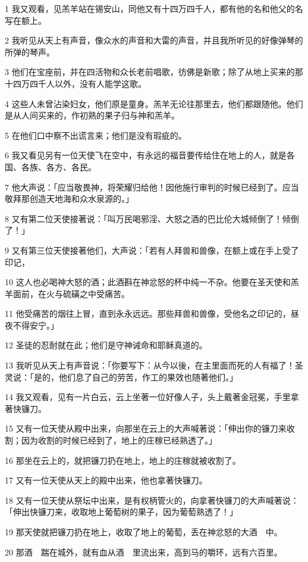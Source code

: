 \par 1 我又观看，见羔羊站在锡安山，同他又有十四万四千人，都有他的名和他父的名写在额上。
\par 2 我听见从天上有声音，像众水的声音和大雷的声音，并且我所听见的好像弹琴的所弹的琴声。
\par 3 他们在宝座前，并在四活物和众长老前唱歌，彷佛是新歌；除了从地上买来的那十四万四千人以外，没有人能学这歌。
\par 4 这些人未曾沾染妇女，他们原是童身。羔羊无论往那里去，他们都跟随他。他们是从人间买来的，作初熟的果子归与神和羔羊。
\par 5 在他们口中察不出谎言来；他们是没有瑕疵的。
\par 6 我又看见另有一位天使飞在空中，有永远的福音要传给住在地上的人，就是各国、各族、各方、各民。
\par 7 他大声说：「应当敬畏神，将荣耀归给他！因他施行审判的时候已经到了。应当敬拜那创造天地海和众水泉源的。」
\par 8 又有第二位天使接著说：「叫万民喝邪淫、大怒之酒的巴比伦大城倾倒了！倾倒了！」
\par 9 又有第三位天使接著他们，大声说：「若有人拜兽和兽像，在额上或在手上受了印记，
\par 10 这人也必喝神大怒的酒；此酒斟在神忿怒的杯中纯一不杂。他要在圣天使和羔羊面前，在火与硫磺之中受痛苦。
\par 11 他受痛苦的烟往上冒，直到永永远远。那些拜兽和兽像，受他名之印记的，昼夜不得安宁。」
\par 12 圣徒的忍耐就在此；他们是守神诫命和耶稣真道的。
\par 13 我听见从天上有声音说：「你要写下：从今以後，在主里面而死的人有福了！圣灵说：「是的，他们息了自己的劳苦，作工的果效也随著他们。」
\par 14 我又观看，见有一片白云，云上坐著一位好像人子，头上戴著金冠冕，手里拿著快镰刀。
\par 15 又有一位天使从殿中出来，向那坐在云上的大声喊著说：「伸出你的镰刀来收割；因为收割的时候已经到了，地上的庄稼已经熟透了。」
\par 16 那坐在云上的，就把镰刀扔在地上，地上的庄稼就被收割了。
\par 17 又有一位天使从天上的殿中出来，他也拿著快镰刀。
\par 18 又有一位天使从祭坛中出来，是有权柄管火的，向拿著快镰刀的大声喊著说：「伸出快镰刀来，收取地上葡萄树的果子，因为葡萄熟透了！」
\par 19 那天使就把镰刀扔在地上，收取了地上的葡萄，丢在神忿怒的大酒　中。
\par 20 那酒　踹在城外，就有血从酒　里流出来，高到马的嚼环，远有六百里。

